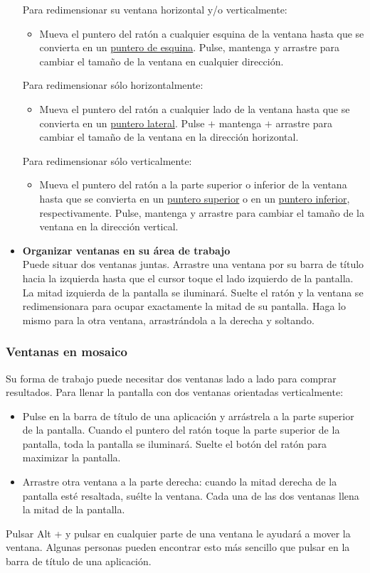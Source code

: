 \begin{itemize}
Para redimensionar su ventana horizontal y/o verticalmente:
\begin{itemize}
\item Mueva el puntero del ratón a cualquier esquina de la ventana hasta que se convierta en un \underline{puntero de esquina}. Pulse, mantenga y arrastre para cambiar el tamaño de la ventana en cualquier dirección.
\end{itemize}
Para redimensionar sólo horizontalmente:
\begin{itemize}
\item Mueva el puntero del ratón a cualquier lado de la ventana hasta que se convierta en un \underline{puntero lateral}. Pulse $+$ mantenga $+$ arrastre para cambiar el tamaño de la ventana en la dirección horizontal.
\end{itemize}
Para redimensionar sólo verticalmente:
\begin{itemize}
\item Mueva el puntero del ratón a la parte superior o inferior de la ventana hasta que se convierta en un \underline{puntero superior} o en un \underline{puntero inferior}, respectivamente. Pulse, mantenga y arrastre para cambiar el tamaño de la ventana en la dirección vertical.
\end{itemize}
\item {\bf Organizar ventanas en su área de trabajo}\\
Puede situar dos ventanas juntas. Arrastre una ventana por su barra de título hacia la izquierda hasta que el cursor toque el lado izquierdo de la pantalla. La mitad izquierda de la pantalla se iluminará. Suelte el ratón y la ventana se redimensionara para ocupar exactamente la mitad de su pantalla. Haga lo mismo para la otra ventana, arrastrándola a la derecha y soltando.
\end{itemize}
\subsubsection{Ventanas en mosaico}
Su forma de trabajo puede necesitar dos ventanas lado a lado para comprar resultados. Para llenar la pantalla con dos ventanas orientadas verticalmente:
\begin{itemize}
\item Pulse en la barra de título de una aplicación y arrástrela a la parte superior de la pantalla. Cuando el puntero del ratón toque la parte superior de la pantalla, toda la pantalla se iluminará. Suelte el botón del ratón para maximizar la pantalla.
\item Arrastre otra ventana a la parte derecha: cuando la mitad derecha de la pantalla esté resaltada, suélte la ventana. Cada una de las dos ventanas llena la mitad de la pantalla.
\end{itemize}
Pulsar Alt + y pulsar en cualquier parte de una ventana le ayudará a mover la ventana. Algunas personas pueden encontrar esto más sencillo que pulsar en la barra de título de una aplicación.
